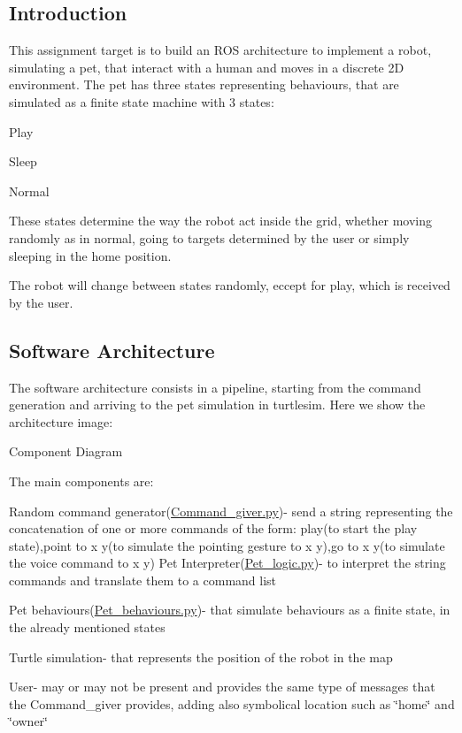 \subsection*{Introduction}

This assignment target is to build an R\+OS architecture to implement a robot, simulating a pet, that interact with a human and moves in a discrete 2D environment. The pet has three states representing behaviours, that are simulated as a finite state machine with 3 states\+:
\begin{DoxyItemize}
\item Play
\item Sleep
\item Normal
\end{DoxyItemize}

These states determine the way the robot act inside the grid, whether moving randomly as in normal, going to targets determined by the user or simply sleeping in the home position.

The robot will change between states randomly, eccept for play, which is received by the user.

\subsection*{Software Architecture}

The software architecture consists in a pipeline, starting from the command generation and arriving to the pet simulation in turtlesim. Here we show the architecture image\+:

 \begin{center}Component Diagram\end{center} 

The main components are\+:


\begin{DoxyItemize}
\item Random command generator(\hyperlink{Command__giver_8py}{Command\+\_\+giver.\+py})-\/ send a string representing the concatenation of one or more commands of the form\+: \textquotesingle{}play\textquotesingle{}(to start the play state),\textquotesingle{}point to x y\textquotesingle{}(to simulate the pointing gesture to x y),\textquotesingle{}go to x y\textquotesingle{}(to simulate the voice command to x y) Pet Interpreter(\hyperlink{Pet__logic_8py}{Pet\+\_\+logic.\+py})-\/ to interpret the string commands and translate them to a command list
\item Pet behaviours(\hyperlink{Pet__behaviours_8py}{Pet\+\_\+behaviours.\+py})-\/ that simulate behaviours as a finite state, in the already mentioned states
\item Turtle simulation-\/ that represents the position of the robot in the map
\item User-\/ may or may not be present and provides the same type of messages that the Command\+\_\+giver provides, adding also symbolical location such as \char`\"{}home\char`\"{} and \char`\"{}owner\char`\"{}
\end{DoxyItemize}

